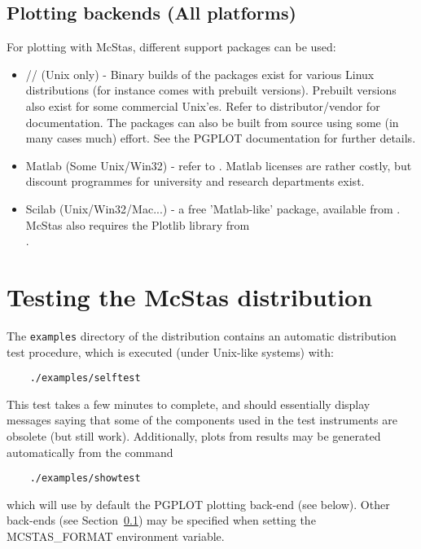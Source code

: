 \subsection{Plotting backends (All platforms)}
\label{s:plotting}
For plotting with McStas, different support packages can be used:
\begin{itemize}
\item{// (Unix only) - Binary builds of the packages
    exist for various Linux distributions (for instance
     comes with
    prebuilt versions). Prebuilt versions also exist for some commercial Unix'es. 
    Refer to distributor/vendor for documentation. The packages can also be
    built from source using some (in many cases much) effort.  See the
    PGPLOT documentation for further details.}
\item{Matlab (Some Unix/Win32) - refer to
    . Matlab licenses are rather costly, but discount programmes for university and research departments exist.}
\item{Scilab (Unix/Win32/Mac...) - a free 'Matlab-like' package, available from
    . McStas also requires the Plotlib library from \\ .}
\end{itemize}

\section{Testing the McStas distribution}
\label{s:testing}

The \verb+examples+ directory of the distribution contains an automatic distribution test procedure, which is executed (under Unix-like systems) with:
\begin{verbatim}
    ./examples/selftest
\end{verbatim}
This test takes a few minutes to complete, and should essentially display messages saying that some of the components used in the test instruments are obsolete (but still work).
Additionally, plots from results may be generated automatically from the command
\begin{verbatim}
    ./examples/showtest
\end{verbatim}
which will use by default the PGPLOT plotting back-end (see below). Other back-ends (see Section~\ref{s:plotting}) may be specified when setting the MCSTAS\_FORMAT environment variable.
